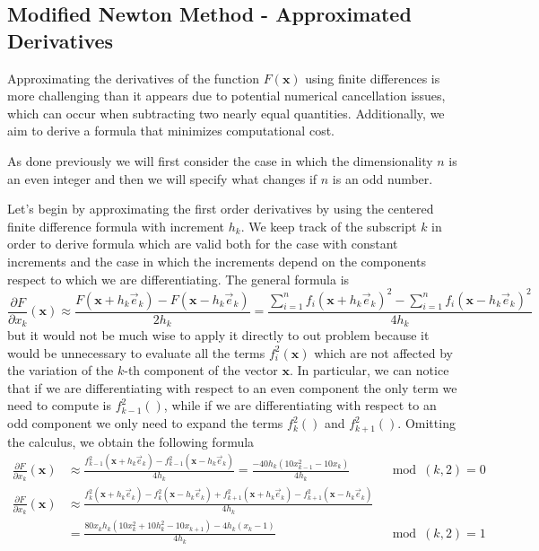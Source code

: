 \medskip
\subsection*{Modified Newton Method - Approximated Derivatives}
Approximating the derivatives of the function $F(\mathbf{x})$ using finite differences is more challenging than it appears due to potential numerical cancellation issues, which can occur when subtracting two nearly equal quantities. Additionally, we aim to derive a formula that minimizes computational cost.

As done previously we will first consider the case in which the dimensionality $n$ is an even integer and then we will specify what changes if $n$ is an odd number.

Let's begin by approximating the first order derivatives by using the centered finite difference formula with increment $h_k$. We keep track of the subscript $k$ in order to derive formula which are valid both for the case with constant increments and the case in which the increments depend on the components respect to which we are differentiating.
The general formula is
$$ \frac{\partial F }{\partial x_k} (\mathbf{x}) \approx \frac{F(\mathbf{x} + h_k \vec{e}_k) - F(\mathbf{x} - h_k \vec{e}_k)}{2h_k} = 
\frac{\sum_{i = 1}^{n} f_i(\mathbf{x} + h_k \vec{e}_k)^2 - \sum_{i = 1}^{n} f_i(\mathbf{x} - h_k \vec{e}_k)^2}{4h_k}$$
but it would not be much wise to apply it directly to out problem because it would be unnecessary to evaluate all the terms $f_i^2(\mathbf{x})$ which are not affected by the variation of the $k$-th component of the vector $\mathbf{x}$.
In particular, we can notice that if we are differentiating with respect to an even component the only term we need to compute is $f_{k-1}^2()$, while if we are differentiating with respect to an odd component we only need to expand the terms $f_k^2()$ and $f_{k+1}^2()$.
Omitting the calculus, we obtain the following formula
\begin{align*}
    \frac{\partial F}{\partial x_k} (\mathbf{x}) &\approx \frac{f_{k-1}^2(\mathbf{x} + h_k \vec{e}_k) - f_{k-1}^2(\mathbf{x} - h_k \vec{e}_k)}{4h_k} = \frac{- 40h_k (10x_{k-1}^2 - 10x_k)}{4h_k} \quad  &\mod(k,2)  = 0 \\
    \frac{\partial F}{\partial x_k} (\mathbf{x}) &\approx \frac{f_{k}^2(\mathbf{x} + h_k \vec{e}_k) - f_{k}^2(\mathbf{x} - h_k \vec{e}_k) + f_{k+1}^2(\mathbf{x} + h_k \vec{e}_k) - f_{k+1}^2(\mathbf{x} - h_k \vec{e}_k)}{4h_k} \\ &= \frac{80x_k h_k (10x_k^2 + 10 h_k^2 -10x_{k+1}) - 4h_k (x_k -1)}{4h_k} \quad &\mod(k,2) = 1
\end{align*}

